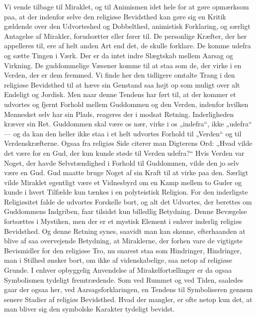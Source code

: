 \documentclass[12pt,a4paper]{article}
\newcommand{\opage}[1]{\marginnote{\footnotesize\textit{[#1]}}}
\begin{document}
Vi vende tilbage til Miraklet, og til Animismen idet%
\opage{30}hele for at gøre
opmærksom paa, at der indenfor selve den religiøse Bevidsthed kan gøre sig
en Kritik gældende over den Udvorteshed og Dobbelthed, animistisk
Forklaring, og særligt Antagelse af Mirakler, forudsætter eller fører til.
De personlige Kræfter, der her appelleres til, ere af helt anden Art end
det, de skulle forklare. De komme udefra og sætte Tingen i Værk. Der er da
intet indre Slægtskab mellem Aarsag og Virkning. De guddommelige Væsener
komme til at staa som de, der virke i en Verden, der er dem fremmed. Vi
finde her den tidligere omtalte Trang i den religiøse Bevidsthed til at hæve
sin Genstand saa højt op som muligt over alt Endeligt og Jordisk. Men naar
denne Tendens har ført til, at der kommer et udvortes og fjernt Forhold
mellem Guddommen og den Verden, indenfor hvilken Mennesket selv har sin
Plads, reageres der i modsat Retning. Inderligheden kræver sin Ret.
Guddommen skal være os nær, virke i os „indefra“, ikke „udefra“ --- og da
kan den heller ikke staa i et helt udvortes Forhold til „Verden“ og til
Verdenskræfterne. Ogsaa fra religiøs Side citerer man Digterens Ord: „Hvad
vilde det være for en Gud, der kun kunde støde til Verden udefra?“ Hvis
Verden var Noget, der havde Selvstændighed i Forhold til Guddommen, vilde
den jo selv være en Gud. Gud maatte bruge Noget af sin Kraft til at virke
paa den. Særligt vilde Miraklet egentligt være et Vidnesbyrd om en Kamp
mellem to Guder og kunde i hvert Tilfælde kun tænkes i en polyteistisk
Religion. For den inderligste Religiøsitet falde de udvortes Forskelle bort,
og alt det Udvortes, der berettes om Guddommens Indgriben, faar tilsidst kun
billedlig Betydning. Denne Bevægelse fortsættes i Mystiken, men der er et
mystisk Element i enhver inderlig religiøs Bevidsthed. Og denne Retning
synes, saavidt man kan skønne, efterhaanden at blive af saa overvejende
Betydning, at Miraklerne, der forhen vare de vigtigste Bevismidler for den
religiøse Tro, nu \opage{31} snarest staa som Hindringer, Hindringer, man i Stilhed
ønsker bort, om ikke af videnskabelige, saa netop af religiøse Grunde. I
enhver opbyggelig Anvendelse af Mirakelfortællinger er da ogsaa Symbolismen
tydeligt fremtrædende. Som ved Rummet og ved Tiden, saaledes gaar der ogsaa
her, ved Aarsagsforklaringen, en Tendens til Symboliseren gennem senere
Stadier af religiøs Bevidsthed. Hvad der mangler, er ofte netop kun det, at
man bliver sig den symbolske Karakter tydeligt bevidst.
\end{document}
